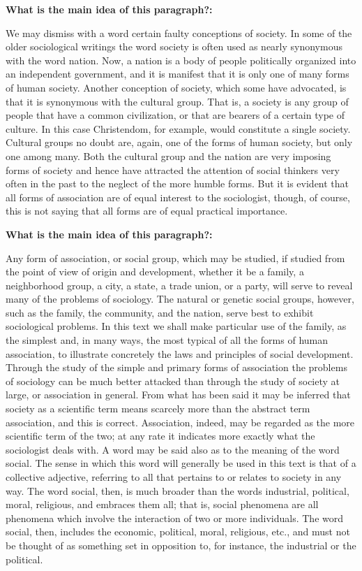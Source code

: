 \begin{enumerate}
\begin{linenumbers}
\textbf{What is the main idea of this paragraph?:} \hrulefill

\hrulefill

\indent We may dismiss with a word certain faulty conceptions of society. In some of the older sociological writings the word society is often used as nearly synonymous with the word nation. Now, a nation is a body of people politically organized into an independent government, and it is manifest that it is only one of many forms of human society. Another conception of society, which some have advocated, is that it is synonymous with the cultural group. That is, a society is any group of people that have a common civilization, or that are bearers of a certain type of culture. In this case Christendom, for example, would constitute a single society. Cultural groups no doubt are, again, one of the forms of human society, but only one among many. Both the cultural group and the nation are very imposing forms of society and hence have attracted the attention of social thinkers very often in the past to the neglect of the more humble forms. But it is evident that all forms of association are of equal interest to the sociologist, though, of course, this is not saying that all forms are of equal practical importance.

\textbf{What is the main idea of this paragraph?:} \hrulefill

\hrulefill

\indent Any form of association, or social group, which may be studied, if studied from the point of view of origin and development, whether it be a family, a neighborhood group, a city, a state, a trade union, or a party, will serve to reveal many of the problems of sociology. The natural or genetic social groups, however, such as the family, the community, and the nation, serve best to exhibit sociological problems. In this text we shall make particular use of the family, as the simplest and, in many ways, the most typical of all the forms of human association, to illustrate concretely the laws and principles of social development. Through the study of the simple and primary forms of association the problems of sociology can be much better attacked than through the study of society at large, or association in general. From what has been said it may be inferred that society as a scientific term means scarcely more than the abstract term association, and this is correct. Association, indeed, may be regarded as the more scientific term of the two; at any rate it indicates more exactly what the sociologist deals with. A word may be said also as to the meaning of the word social. The sense in which this word will generally be used in this text is that of a collective adjective, referring to all that pertains to or relates to society in any way. The word social, then, is much broader than the words industrial, political, moral, religious, and embraces them all; that is, social phenomena are all phenomena which involve the interaction of two or more individuals. The word social, then, includes the economic, political, moral, religious, etc., and must not be thought of as something set in opposition to, for instance, the industrial or the political.


\end{linenumbers}
\end{enumerate}
